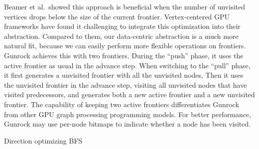 \documentclass[format=acmsmall,review=false,screen=true]{acmart}
\begin{document}
Beamer et al.\ showed this approach is beneficial when the number of
unvisited vertices drops below the size of the current frontier.
Vertex-centered GPU frameworks have found it challenging to integrate
this optimization into their abstraction. Compared to them, our
data-centric abstraction is a much more natural fit, because we can
easily perform more flexible operations on frontiers. Gunrock achieves
this with two frontiers. During the ``push'' phase, it uses the active
frontier as usual in the advance step. When switching to the ``pull''
phase, it first generates a unvisited frontier with all the unvisited
nodes, Then it uses the unvisited frontier in the advance step,
visiting all unvisited nodes that have visited predecessors, and
generates both a new active frontier and a new unvisited frontier. The
capability of keeping two active frontiers differentiates Gunrock from
other GPU graph processing programming models. For better performance,
Gunrock may use per-node bitmaps to indicate whether a node has been
visited.

\begin{algorithm}
    \caption{Direction optimizing BFS}\label{alg:push_pull}
\end{algorithm}
\end{document}
